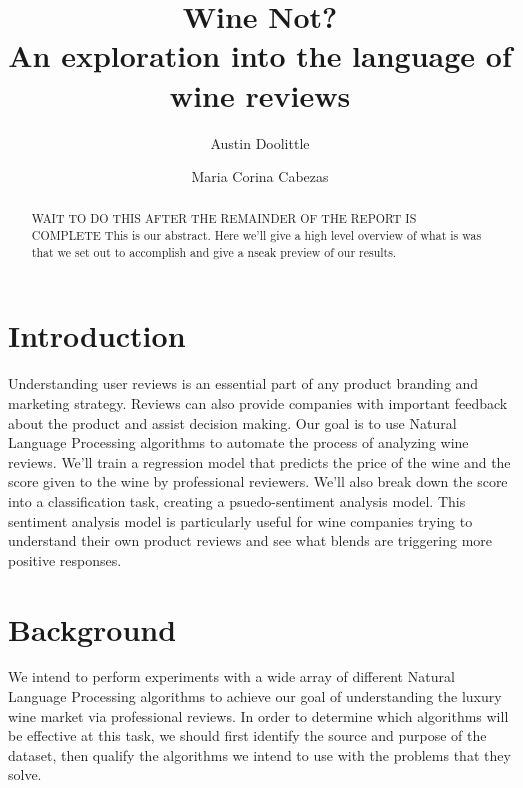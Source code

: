 \documentclass[10pt]{IEEEtran}
\title{
    Wine Not? \\
    \large An exploration into the language of wine reviews
}
\author[1]{Austin Doolittle}
\author[1]{Maria Corina Cabezas}
\affil[1]{University of California, Berkeley, \authorcr Email: {\tt \{austin.doolittle, m.cabezas95\}@berkeley.edu}\vspace{1.5ex}}
\begin{document}
\maketitle
\begin{abstract}
    WAIT TO DO THIS AFTER THE REMAINDER OF THE REPORT IS COMPLETE
    This is our abstract. Here we'll give a high level overview of what is was that we set out to accomplish and give a nseak preview of our results.
\end{abstract}

\section{Introduction}
    Understanding user reviews is an essential part of any product branding and marketing strategy. Reviews can also provide companies with important feedback about the product and assist decision making. Our goal is to use Natural Language Processing algorithms to automate the process of analyzing wine reviews. We'll train a regression model that predicts the price of the wine and the score given to the wine by professional reviewers. We'll also break down the score into a classification task, creating a psuedo-sentiment analysis model. This sentiment analysis model is particularly useful for wine companies trying to understand their own product reviews and see what blends are triggering more positive responses. 

\section{Background}
    We intend to perform experiments with a wide array of different Natural Language Processing algorithms to achieve our goal of understanding the luxury wine market via professional reviews. In order to determine which algorithms will be effective at this task, we should first identify the source and purpose of the dataset, then qualify the algorithms we intend to use with the problems that they solve.
\end{document}
